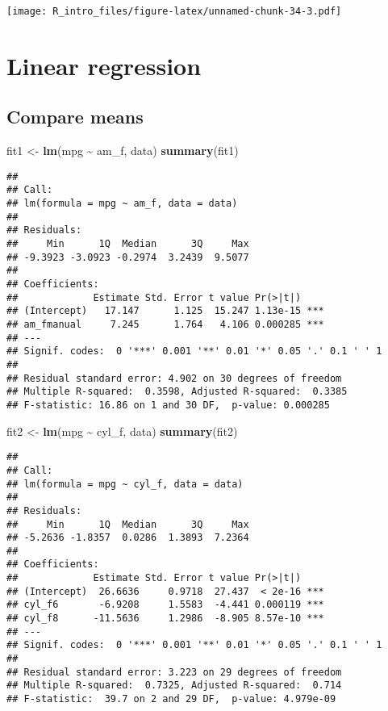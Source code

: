 \documentclass[
  a4paper,
]{article}
\newenvironment{Shaded}{\begin{snugshade}}{\end{snugshade}}
\newcommand{\FunctionTok}[1]{\textcolor[rgb]{0.13,0.29,0.53}{\textbf{#1}}}
\newcommand{\NormalTok}[1]{#1}
\newcommand{\OtherTok}[1]{\textcolor[rgb]{0.56,0.35,0.01}{#1}}
\newcommand{\SpecialCharTok}[1]{\textcolor[rgb]{0.81,0.36,0.00}{\textbf{#1}}}
\begin{document}
\texttt{[image: R\_intro\_files/figure-latex/unnamed-chunk-34-3.pdf]}

\section{Linear regression}\label{linear-regression}

\subsection{Compare means}\label{compare-means}

\begin{Shaded}
\begin{Highlighting}[]
\NormalTok{fit1 }\OtherTok{\textless{}{-}} \FunctionTok{lm}\NormalTok{(mpg }\SpecialCharTok{\textasciitilde{}}\NormalTok{ am\_f, data)}
\FunctionTok{summary}\NormalTok{(fit1)}
\end{Highlighting}
\end{Shaded}

\begin{verbatim}
## 
## Call:
## lm(formula = mpg ~ am_f, data = data)
## 
## Residuals:
##     Min      1Q  Median      3Q     Max 
## -9.3923 -3.0923 -0.2974  3.2439  9.5077 
## 
## Coefficients:
##             Estimate Std. Error t value Pr(>|t|)    
## (Intercept)   17.147      1.125  15.247 1.13e-15 ***
## am_fmanual     7.245      1.764   4.106 0.000285 ***
## ---
## Signif. codes:  0 '***' 0.001 '**' 0.01 '*' 0.05 '.' 0.1 ' ' 1
## 
## Residual standard error: 4.902 on 30 degrees of freedom
## Multiple R-squared:  0.3598, Adjusted R-squared:  0.3385 
## F-statistic: 16.86 on 1 and 30 DF,  p-value: 0.000285
\end{verbatim}

\begin{Shaded}
\begin{Highlighting}[]
\NormalTok{fit2 }\OtherTok{\textless{}{-}} \FunctionTok{lm}\NormalTok{(mpg }\SpecialCharTok{\textasciitilde{}}\NormalTok{ cyl\_f, data)}
\FunctionTok{summary}\NormalTok{(fit2)}
\end{Highlighting}
\end{Shaded}

\begin{verbatim}
## 
## Call:
## lm(formula = mpg ~ cyl_f, data = data)
## 
## Residuals:
##     Min      1Q  Median      3Q     Max 
## -5.2636 -1.8357  0.0286  1.3893  7.2364 
## 
## Coefficients:
##             Estimate Std. Error t value Pr(>|t|)    
## (Intercept)  26.6636     0.9718  27.437  < 2e-16 ***
## cyl_f6       -6.9208     1.5583  -4.441 0.000119 ***
## cyl_f8      -11.5636     1.2986  -8.905 8.57e-10 ***
## ---
## Signif. codes:  0 '***' 0.001 '**' 0.01 '*' 0.05 '.' 0.1 ' ' 1
## 
## Residual standard error: 3.223 on 29 degrees of freedom
## Multiple R-squared:  0.7325, Adjusted R-squared:  0.714 
## F-statistic:  39.7 on 2 and 29 DF,  p-value: 4.979e-09
\end{verbatim}
\end{document}
